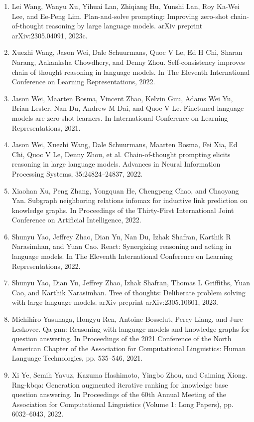 \documentclass[11pt,UTF8,fontset=fandol]{ctexart}
\begin{document}
\begin{enumerate}[leftmargin=2em]
\item Lei Wang, Wanyu Xu, Yihuai Lan, Zhiqiang Hu, Yunshi Lan, Roy Ka-Wei Lee, and Ee-Peng Lim. Plan-and-solve prompting: Improving zero-shot chain-of-thought reasoning by large language models. arXiv preprint arXiv:2305.04091, 2023c.
\item Xuezhi Wang, Jason Wei, Dale Schuurmans, Quoc V Le, Ed H Chi, Sharan Narang, Aakanksha Chowdhery, and Denny Zhou. Self-consistency improves chain of thought reasoning in language models. In The Eleventh International Conference on Learning Representations, 2022.
\item Jason Wei, Maarten Bosma, Vincent Zhao, Kelvin Guu, Adams Wei Yu, Brian Lester, Nan Du, Andrew M Dai, and Quoc V Le. Finetuned language models are zero-shot learners. In International Conference on Learning Representations, 2021.
\item Jason Wei, Xuezhi Wang, Dale Schuurmans, Maarten Bosma, Fei Xia, Ed Chi, Quoc V Le, Denny Zhou, et al. Chain-of-thought prompting elicits reasoning in large language models. Advances in Neural Information Processing Systems, 35:24824--24837, 2022.
\item Xiaohan Xu, Peng Zhang, Yongquan He, Chengpeng Chao, and Chaoyang Yan. Subgraph neighboring relations infomax for inductive link prediction on knowledge graphs. In Proceedings of the Thirty-First International Joint Conference on Artificial Intelligence, 2022.
\item Shunyu Yao, Jeffrey Zhao, Dian Yu, Nan Du, Izhak Shafran, Karthik R Narasimhan, and Yuan Cao. React: Synergizing reasoning and acting in language models. In The Eleventh International Conference on Learning Representations, 2022.
\item Shunyu Yao, Dian Yu, Jeffrey Zhao, Izhak Shafran, Thomas L Griffiths, Yuan Cao, and Karthik Narasimhan. Tree of thoughts: Deliberate problem solving with large language models. arXiv preprint arXiv:2305.10601, 2023.
\item Michihiro Yasunaga, Hongyu Ren, Antoine Bosselut, Percy Liang, and Jure Leskovec. Qa-gnn: Reasoning with language models and knowledge graphs for question answering. In Proceedings of the 2021 Conference of the North American Chapter of the Association for Computational Linguistics: Human Language Technologies, pp. 535--546, 2021.
\item Xi Ye, Semih Yavuz, Kazuma Hashimoto, Yingbo Zhou, and Caiming Xiong. Rng-kbqa: Generation augmented iterative ranking for knowledge base question answering. In Proceedings of the 60th Annual Meeting of the Association for Computational Linguistics (Volume 1: Long Papers), pp. 6032--6043, 2022.

\end{enumerate}
\end{document}
